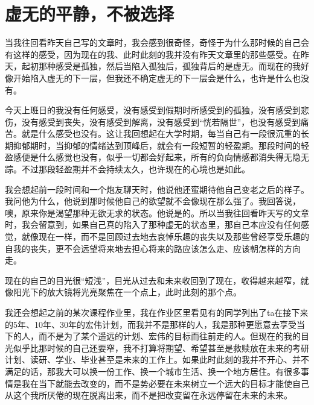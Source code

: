 \chapter{虚无的平静，不被选择}








当我往回看昨天自己写的文章时，我会感到很奇怪，奇怪于为什么那时候的自己会有这样的感受，因为现在的我、此时此刻的我并没有昨天文章里的那些感受。在昨天，起初那种感受是孤独，然后当陷入孤独后，孤独背后的是虚无。而现在的我好像开始陷入虚无的下一层，但我还不确定虚无的下一层会是什么，也许是什么也没有。

今天上班日的我没有任何感受，没有感受到假期时所感受到的孤独，没有感受到悲伤，没有感受到丧失，没有感受到解离，没有感受到“恍若隔世”，也没有感受到痛苦。就是什么感受也没有。这让我回想起在大学时期，每当自己有一段很沉重的长期抑郁期时，当抑郁的情绪达到顶峰后，就会有一段短暂的轻盈期。那段时间的轻盈感便是什么感觉也没有，似乎一切都会好起来，所有的负向情感都消失得无隐无踪。不过那段轻盈期并不会持续太久，也许现在的心境也是如此。

我会想起前一段时间和一个炮友聊天时，他说他还蛮期待他自己变老之后的样子。我问他为什么，他说到那时候他自己的欲望就不会像现在那么强了。我回答说，噢，原来你是渴望那种无欲无求的状态。他说是的。所以当我往回看昨天写的文章时，我会留意到，如果自己真的陷入了那种虚无的状态里，那自己本应没有任何感觉，就像现在一样，而不是回顾过去地去哀悼乐趣的丧失以及那些曾经享受乐趣的自我的丧失，更不会远望将来地去担心将来的路应该怎么走、应该朝怎样的方向走。

现在的自己的目光很“短浅”，目光从过去和未来收回到了现在，收得越来越窄，就像阳光下的放大镜将光亮聚焦在一个点上，此时此刻的那个点。


我还会想起之前的某次课程作业里，我在作业区里看见有的同学列出了ta在接下来的5年、10年、30年的宏伟计划，而我并不是那样的人，我是那种更愿意去享受当下的人，而不是为了某个遥远的计划、宏伟的目标而往前走的人。但现在的我的目光似乎比那时候的自己还要窄，我不打算将期望、希望甚至是救赎放在未来的考研计划、读研、学业、毕业甚至是未来的工作上。如果此时此刻的我并不开心、并不满足的话，那我大可以换一份工作、换一个城市生活、换一个地方居住。有很多事情是我在当下就能去改变的，而不是势必要在未来树立一个远大的目标才能使自己从这个我所厌倦的现在脱离出来，而不是把改变留在永远停留在未来的未来。

